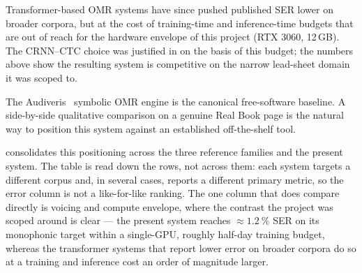 Transformer-based OMR systems
\cite{riosVilaSheetMusicTransformer2024,riosVilaSMTPlusPlus2024,mayerPracticalEndToEnd2024,yangLEGATO2025}
have since pushed published SER lower on broader corpora, but at the
cost of training-time and inference-time budgets that are out of
reach for the hardware envelope of this project (RTX 3060, 12\,GB).
The CRNN--CTC choice was justified in  on
the basis of this budget; the numbers above show the resulting system
is competitive on the narrow lead-sheet domain it was scoped to.

The Audiveris~\cite{audiverisAudiveris} symbolic OMR engine is the
canonical free-software baseline.  A side-by-side qualitative
comparison on a genuine Real Book page is the natural way to position
this system against an established off-the-shelf tool.

 consolidates this positioning across the
three reference families and the present system.
The table is read down the rows, not across them: each system targets a
different corpus and, in several cases, reports a different primary
metric, so the error column is not a like-for-like ranking.
The one column that does compare directly is voicing and compute
envelope, where the contrast the project was scoped around is clear ---
the present system reaches $\approx\SI{1.2}{\percent}$ SER on its
monophonic target within a single-GPU, roughly half-day training
budget, whereas the transformer systems that report lower error on
broader corpora do so at a training and inference cost an order of
magnitude larger.

